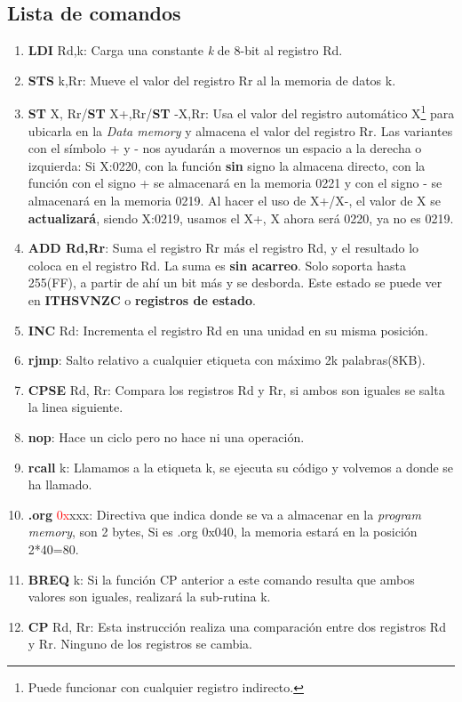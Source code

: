 \documentclass[
	12pt, %
	fleqn, %
	a4paper, %
	oneside, %
]{LegrandOrangeBook}
\begin{document}
\subsection{Lista de comandos}
\begin{enumerate}
\item \textbf{LDI} Rd,k: Carga una constante \textit{k} de 8-bit al registro Rd.
\item \textbf{STS} k,Rr: Mueve el valor del registro Rr al la memoria de datos k.
\item \textbf{ST} X, Rr/\textbf{ST} X+,Rr/\textbf{ST} -X,Rr: Usa el valor del registro automático X\footnote{Puede funcionar con cualquier registro indirecto.} para ubicarla en la \textit{Data memory} y almacena el valor del registro Rr. Las variantes con el símbolo + y - nos ayudarán a movernos un espacio a la derecha o izquierda: Si X:0220, con la función \textbf{sin} signo la almacena directo, con la función con el signo + se almacenará en la memoria 0221 y con el signo - se almacenará en la memoria 0219. Al hacer el uso de X+/X-, el valor de X se \textbf{actualizará}, siendo X:0219, usamos el X+, X ahora será 0220, ya no es 0219.
\item \textbf{ADD Rd,Rr}: Suma el registro Rr más el registro Rd, y el resultado lo coloca en el registro Rd. La suma es \textbf{sin acarreo}. Solo soporta hasta 255(FF), a partir de ahí un bit más y se desborda. Este estado se puede ver en \textbf{ITHSVNZC} o \textbf{registros de estado}.
\item \textbf{INC} Rd: Incrementa el registro Rd en una unidad en su misma posición.
\item \textbf{rjmp}: Salto relativo a cualquier etiqueta con máximo 2k palabras(8KB).
\item \textbf{CPSE} Rd, Rr: Compara los registros Rd y Rr, si ambos son iguales se salta la linea siguiente.
\item \textbf{nop}: Hace un ciclo pero no hace ni una operación.
\item \textbf{rcall} k: Llamamos a la etiqueta k, se ejecuta su código y volvemos a donde se ha llamado.
\item \textbf{.org} \textcolor{red}{0x}xxx: Directiva que indica donde se va a almacenar en la \textit{program memory}, son 2 bytes, Si es .org 0x040, la memoria estará en la posición 2*40=80.
\item \textbf{BREQ} k: Si la función CP anterior a este comando resulta que ambos valores son iguales, realizará la sub-rutina k.
\item \textbf{CP} Rd, Rr: Esta instrucción realiza una comparación entre dos registros Rd y Rr. Ninguno de los registros se cambia.

\end{enumerate}
\end{document}
